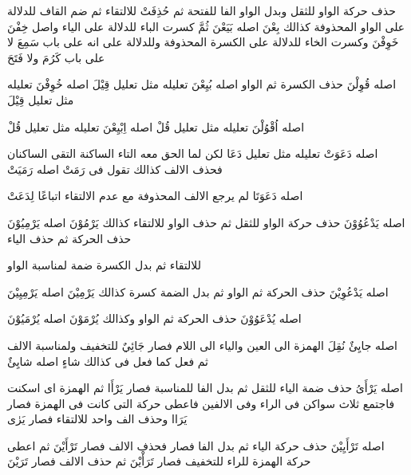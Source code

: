 \begin{twocol}
\begin{rightcol}
حذف حركة الواو للثقل وبدل الواو الفا للفتحة ثم حُذِفَتْ للالتقاء ثم ضم القاف للدلالة على الواو المحذوفة كذالك بِعْنَ اصله بَيَعْنَ ثُمَّ كسرت الباء للدلالة على الياء واصل خِفْنَ خَوِفْنَ وكسرت الخاء للدلالة على الكسرة المحذوفة وللدلالة على انه على باب سَمِعَ لا على باب كَرُمَ ولا فَتَحَ
\par
{}
اصله قُوِلْنَ حذف الكسرة ثم الواو اصله بُيِعْنَ تعليله مثل تعليل قِيْلَ اصله خُوِفْنَ تعليله مثل تعليل قِيْلَ
\par
{}
اصله اُقْوُلْنَ تعليله مثل تعليل قُلْ اصله اِبْيِعْنَ تعليله مثل تعليل قُلْ
\par
{}
اصله دَعَوَتْ تعليله مثل تعليل دَعَا لكن لما الحق معه التاء الساكنة التقى الساكنان فحذف الالف كذالك تقول فى رَمَتْ اصله رَمَيَتْ
\par
{}
اصله دَعَوَتَا لم يرجع الالف المحذوفة مع عدم الالتقاء اتباعًا لِدَعَتْ
\par
{}
اصله يَدْعُوُوْنَ حذف حركة الواو للثقل ثم حذف الواو للالتقاء كذالك يَرْمُوْنَ اصله يَرْمِيُوْنَ حذف الحركة ثم حذف الياء
\end{rightcol}
\begin{leftcol}
للالتقاء ثم بدل الكسرة ضمة لمناسبة الواو
\par
{}
اصله يَدْعُوِيْنَ حذف الحركة ثم الواو ثم بدل الضمة كسرة كذالك يَرْمِيْنَ اصله يَرْمِيِيْنَ
\par
{}
اصله يُدْعَوُوْنَ حذف الحركة ثم الواو وكذالك يُرْمَوْنَ اصله يُرْمَيُوْنَ
\par
{}
اصله جايِئٌ نُقِلَ الهمزة الى العين والياء الى اللام فصار جَائِيٌ للتخفيف ولمناسبة الالف ثم فعل كما فعل فى  كذالك شاءٍ اصله شايِئٌ
\par
{}
اصله يَرْأَىُ حذف ضمة الياء للثقل ثم بدل الفا للمناسبة فصار يَرْأَا ثم  الهمزة اى اسكنت فاجتمع ثلاث سواكن فى الراء وفى الالفين فاعطى حركة التى كانت فى الهمزة فصار يَرَاا وحذف الف واحد للالتقاء فصار يَرٰى
\par
{}
اصله تَرْأَيِيْنَ حذف حركة الياء ثم بدل الفا فصار  فحذف الالف فصار تَرْأَيْنَ ثم اعطى حركة الهمزة للراء للتخفيف فصار تَرَأْيْنَ ثم حذف الالف فصار تَرَيْنَ
\end{leftcol}
\end{twocol}
